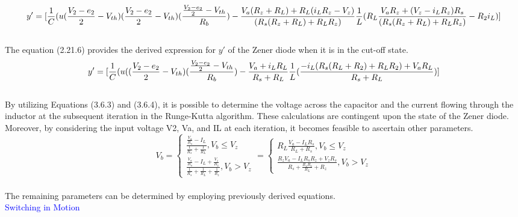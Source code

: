 \begin{equation}
    y'=[\frac{1}{C}(u(\frac{V_2-e_2}{2}-V_{th})(\frac{V_2-e_2}{2}-V_{th})(\frac{\frac{V_2-e_2}{2}-V_{th}}{R_b})-\frac{V_a(R_z+R_L)+R_L(i_LR_z-V_z)}{(R_s(R_z+R_L)+R_LR_z)}\\
    \frac{1}{L}(R_L\frac{V_aR_z+(V_z-i_LR_z)R_s}{(R_s(R_z+R_L)+R_LR_z)}-R_2i_L)]
\end{equation}\\

The equation (2.21.6) provides the derived expression for $y'$ of the Zener diode when it is in the cut-off state.\\

\begin{equation}
    y'=[\frac{1}{C}(u((\frac{V_2-e_2}{2}-V_{th})(\frac{\frac{V_2-e_2}{2}-V_{th}}{R_b})-\frac{V_a+i_LR_L}{R_s+R_L}\\
    \frac{1}{L}(\frac{-i_L(R_s(R_L+R_2)+R_LR_2)+V_aR_L}{R_s+R_L})]
\end{equation}\\

By utilizing Equations (3.6.3) and (3.6.4), it is possible to determine the voltage across the capacitor and the current flowing through the inductor at the subsequent iteration in the Runge-Kutta algorithm. These calculations are contingent upon the state of the Zener diode. Moreover, by considering the input voltage V2, Va, and IL at each iteration, it becomes feasible to ascertain other parameters.\\

\begin{equation}
    V_b=\begin{cases}
        \frac{\frac{V_a}{R_s}-I_L}{\frac{1}{R_s}+\frac{1}{R_L}}, V_b \leq V_z\\
        \frac{\frac{V_a}{R_s}-I_L+\frac{V_z}{R_z}}{\frac{1}{R_s}+\frac{1}{R_L}+\frac{1}{R_z}}, V_b>V_z
    \end{cases}=\begin{cases}
        R_L\frac{V_a-I_LR_s}{R_L+R_s}, V_b \leq V_z\\
        \frac{R_zV_a-I_LR_sR_z+V_zR_s}{R_s+\frac{R_sR_z}{R_L}+R_z}, V_b>V_z
    \end{cases}
\end{equation}\\

The remaining parameters can be determined by employing previously derived equations.\\

\textcolor{blue}{Switching in Motion}\\

